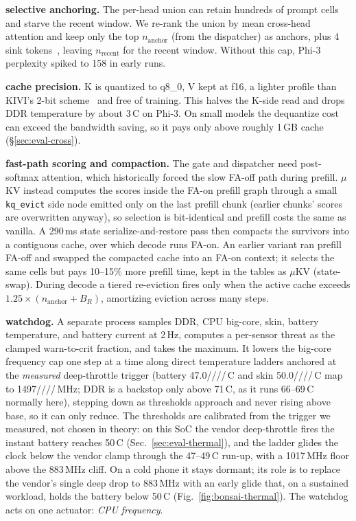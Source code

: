 \documentclass[sigconf, anonymous=false, screen=true]{acmart}
\newcommand{\slb}{/\allowbreak}
\begin{document}
\textbf{selective anchoring.} The per-head union can retain hundreds of prompt cells and starve the recent window. We re-rank the union by mean cross-head attention and keep only the top $n_\mathrm{anchor}$ (from the dispatcher) as anchors, plus 4 sink tokens~\cite{xiao2024streamingllm}, leaving $n_\mathrm{recent}$ for the recent window. Without this cap, Phi-3 perplexity spiked to 158 in early runs.

\textbf{cache precision.} K is quantized to q8\_0, V kept at f16, a lighter profile than KIVI's 2-bit scheme~\cite{liu2024kivi} and free of training. This halves the K-side read and drops DDR temperature by about 3\,\textdegree C on Phi-3. On small models the dequantize cost can exceed the bandwidth saving, so it pays only above roughly 1\,GB cache (\S\ref{sec:eval-cross}).

\textbf{fast-path scoring and compaction.} The gate and dispatcher need post-softmax attention, which historically forced the slow FA-off path during prefill. $\mu$KV instead computes the scores inside the FA-on prefill graph through a small \texttt{kq\_evict} side node emitted only on the last prefill chunk (earlier chunks' scores are overwritten anyway), so selection is bit-identical and prefill costs the same as vanilla. A 290\,ms state serialize-and-restore pass then compacts the survivors into a contiguous cache, over which decode runs FA-on. An earlier variant ran prefill FA-off and swapped the compacted cache into an FA-on context; it selects the same cells but pays 10--15\% more prefill time, kept in the tables as $\mu$KV (state-swap). During decode a tiered re-eviction fires only when the active cache exceeds $1.25\times(n_{\text{anchor}}+B_R)$, amortizing eviction across many steps.

\textbf{watchdog.} A separate process samples DDR, CPU big-core, skin, battery temperature, and battery current at 2\,Hz, computes a per-sensor threat as the clamped warn-to-crit fraction, and takes the maximum. It lowers the big-core frequency cap one step at a time along direct temperature ladders anchored at the \emph{measured} deep-throttle trigger (battery 47.0\slb48.0\slb48.5\slb49.0\slb49.5\,\textdegree C and skin 50.0\slb51.0\slb51.5\slb52.0\slb52.5\,\textdegree C map to 1497\slb1382\slb1267\slb1132\slb1017\,MHz; DDR is a backstop only above 71\,\textdegree C, as it runs 66--69\,\textdegree C normally here), stepping down as thresholds approach and never rising above base, so it can only reduce. The thresholds are calibrated from the trigger we measured, not chosen in theory: on this SoC the vendor deep-throttle fires the instant battery reaches 50\,\textdegree C (Sec.~\ref{sec:eval-thermal}), and the ladder glides the clock below the vendor clamp through the 47--49\,\textdegree C run-up, with a 1017\,MHz floor above the 883\,MHz cliff. On a cold phone it stays dormant; its role is to replace the vendor's single deep drop to 883\,MHz with an early glide that, on a sustained workload, holds the battery below 50\,\textdegree C (Fig.~\ref{fig:bonsai-thermal}). The watchdog acts on one actuator: \emph{CPU frequency}.
\end{document}
